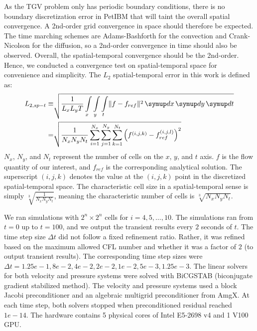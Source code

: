 As the TGV problem only has periodic boundary conditions, there is no boundary discretization error in PetIBM that will taint the overall spatial convergence.
A 2nd-order grid convergence in space should therefore be expected.
The time marching schemes are Adams-Bashforth for the convection and Crank-Nicolson for the diffusion, so a 2nd-order convergence in time should also be observed.
Overall, the spatial-temporal convergence should be the 2nd-order.
Hence, we conducted a convergence test on spatial-temporal space for  convenience and simplicity.
The $L_2$ spatial-temporal error in this work is defined as:
\begin{equation}\label{eq:spt-err-def}
    \begin{aligned}
    L_{2,sp-t} \equiv &\sqrt{
        \frac{1}{L_x L_y T}
        \int\limits_{x} \int\limits_{y} \int\limits_{t} \lVert f - f_{ref} \rVert^2 \diff x \diff y \diff t
    } \\
    = &
    \sqrt{\frac{1}{N_x N_y N_t}\sum\limits_{i=1}^{N_x}\sum\limits_{j=1}^{N_y}\sum\limits_{k=1}^{N_t}\left(f^{(i, j, k)} - f_{ref}^{(i, j, l)}\right)^2}
    \end{aligned}
\end{equation}
$N_x$, $N_y$, and $N_t$ represent the number of cells on the $x$, $y$, and $t$ axis.
$f$ is the flow quantity of our interest, and $f_{ref}$ is the corresponding analytical solution.
The superscript $(i, j, k)$ denotes the value at the $(i, j, k)$ point in the discretized spatial-temporal space.
The characteristic cell size in a spatial-temporal sense is simply $\sqrt[3]{\frac{1}{N_x N_y N_t}}$, meaning the characteristic number of cells is $\sqrt[3]{N_x N_y N_t}$.

We ran simulations with $2^{n} \times 2^{n}$ cells for $i=4, 5, \dots, 10$.
The simulations ran from $t=0$ up to $t=100$, and we output the transient results every $2$ seconds of $t$.
The time step size $\Delta t$ did not follow a fixed refinement ratio.
Rather, it was refined based on the maximum allowed CFL number and whether it was a factor of $2$ (to output transient results).
The corresponding time step sizes were $\Delta t = 1.25e-1, 8e-2, 4e-2, 2e-2, 1e-2, 5e-3, 1.25e-3$.
The linear solvers for both velocity and pressure systems were solved with BiCGSTAB (biconjugate gradient stabilized method).
The velocity and pressure systems used a block Jacobi preconditioner and an algebraic multigrid preconditioner from AmgX.
At each time step, both solvers stopped when preconditioned residual reached $1e-14$.
The hardware contains 5 physical cores of Intel E5-2698 v4 and 1 V100 GPU.

